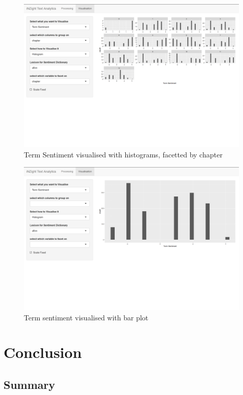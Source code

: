 \documentclass[11pt, a4paper, oneside]{report}
\begin{document}
\begin{figure}
\centering
\includegraphics[scale=0.4]{visualisation-term-sentiment-hist-facet.png}
\caption{Term Sentiment visualised with histograms, facetted by chapter\label{fig:visualisation-term-sentiment-hist-facet}}
\end{figure}

\begin{figure}
\centering
\includegraphics[scale=0.4]{visualisation-term-sentiment.png}
\caption{Term sentiment visualised with bar plot\label{fig:visualisation-term-sentiment}}
\end{figure}

\chapter{Conclusion}\label{cha:conclusion}

\section{Summary}\label{sec:summary}
\end{document}

